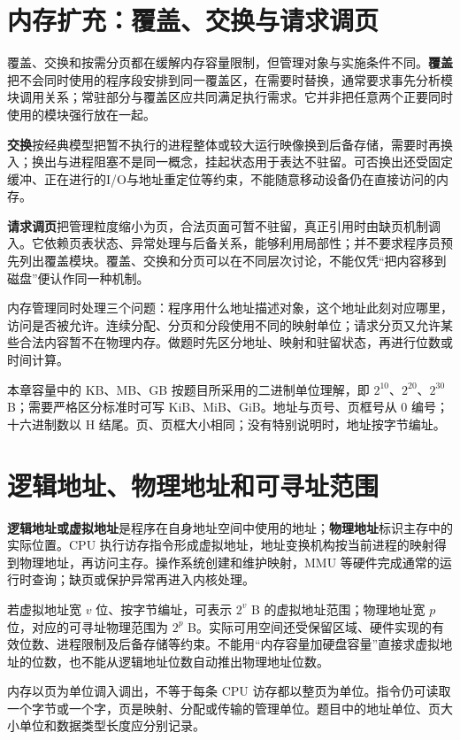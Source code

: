 \section{内存扩充：覆盖、交换与请求调页}\label{OS03-extension}

覆盖、交换和按需分页都在缓解内存容量限制，但管理对象与实施条件不同。\textbf{覆盖}把不会同时使用的程序段安排到同一覆盖区，在需要时替换，通常要求事先分析模块调用关系；常驻部分与覆盖区应共同满足执行需求。它并非把任意两个正要同时使用的模块强行放在一起。

\textbf{交换}按经典模型把暂不执行的进程整体或较大运行映像换到后备存储，需要时再换入；换出与进程阻塞不是同一概念，挂起状态用于表达不驻留。可否换出还受固定缓冲、正在进行的I/O与地址重定位等约束，不能随意移动设备仍在直接访问的内存。

\textbf{请求调页}把管理粒度缩小为页，合法页面可暂不驻留，真正引用时由缺页机制调入。它依赖页表状态、异常处理与后备关系，能够利用局部性；并不要求程序员预先列出覆盖模块。覆盖、交换和分页可以在不同层次讨论，不能仅凭``把内容移到磁盘''便认作同一种机制。

内存管理同时处理三个问题：程序用什么地址描述对象，这个地址此刻对应哪里，访问是否被允许。连续分配、分页和分段使用不同的映射单位；请求分页又允许某些合法内容暂不在物理内存。做题时先区分地址、映射和驻留状态，再进行位数或时间计算。

本章容量中的 KB、MB、GB 按题目所采用的二进制单位理解，即 \(2^{10}\)、\(2^{20}\)、\(2^{30}\) B；需要严格区分标准时可写 KiB、MiB、GiB。地址与页号、页框号从 0 编号；十六进制数以 H 结尾。页、页框大小相同；没有特别说明时，地址按字节编址。

\section{逻辑地址、物理地址和可寻址范围}\label{OS03-5-1}

\textbf{逻辑地址或虚拟地址}是程序在自身地址空间中使用的地址；\textbf{物理地址}标识主存中的实际位置。CPU 执行访存指令形成虚拟地址，地址变换机构按当前进程的映射得到物理地址，再访问主存。操作系统创建和维护映射，MMU 等硬件完成通常的运行时查询；缺页或保护异常再进入内核处理。

若虚拟地址宽 \(v\) 位、按字节编址，可表示 \(2^v\) B 的虚拟地址范围；物理地址宽 \(p\) 位，对应的可寻址物理范围为 \(2^p\) B。实际可用空间还受保留区域、硬件实现的有效位数、进程限制及后备存储等约束。不能用``内存容量加硬盘容量''直接求虚拟地址的位数，也不能从逻辑地址位数自动推出物理地址位数。

内存以页为单位调入调出，不等于每条 CPU 访存都以整页为单位。指令仍可读取一个字节或一个字，页是映射、分配或传输的管理单位。题目中的地址单位、页大小单位和数据类型长度应分别记录。

